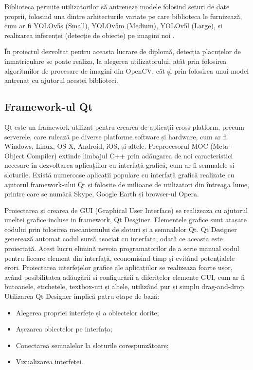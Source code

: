 \documentclass[12pt]{article}
\begin{document}
Biblioteca permite utilizatorilor s\u{a} antreneze modele folosind seturi de date proprii, folosind una dintre arhitecturile variate pe care biblioteca le furnizeaz\u{a}, cum ar fi YOLOv5s (Small), YOLOv5m (Medium), YOLOv5l (Large),  și realizarea inferenței (detecție de obiecte) pe imagini noi \cite{yolo}. 

\^{I}n proiectul dezvoltat pentru aceasta lucrare de diplom\u{a}, detecția placuțelor de \^{i}nmatriculare se poate realiza, la alegerea utilizatorului, at\^{a}t prin folosirea algoritmilor de procesare de imagini din OpenCV, c\^{a}t și prin folosirea unui model antrenat cu ajutorul acestei biblioteci.

\subsection{Framework-ul Qt}
Qt este un framework utilizat pentru crearea de aplicații cross-platform, precum serverele, care ruleaz\u{a} pe diverse platforme software și hardware, cum ar fi Windows, Linux, OS X, Android, iOS, și altele. Preprocesorul MOC (Meta-Object Compiler) extinde limbajul C++ prin ad\u{a}ugarea de noi caracteristici necesare \^{i}n dezvoltarea aplicațiilor cu interfaț\u{a} grafic\u{a}, cum ar fi semnalele si sloturile. Exist\u{a} numeroase aplicații populare cu interfaț\u{a} grafic\u{a} realizate cu ajutorul framework-ului Qt și folosite de milioane de utilizatori din \^{i}ntreaga lume, printre care se num\u{a}r\u{a} Skype, Google Earth și browser-ul Opera. \cite{qt}

Proiectarea și crearea de GUI (Graphical User Interface) se realizeaza cu ajutorul uneltei grafice incluse in framework, Qt Desginer. Elementele grafice sunt atașate codului prin folosirea mecanismului de sloturi și a semnalelor Qt. Qt Designer genereaz\u{a} automat codul surs\u{a} asociat cu interfața, odat\u{a} ce aceasta este proiectat\u{a}. \cite{qtdesigner} Acest lucru elimin\u{a} nevoia programatorilor de a scrie manual codul pentru fiecare element din interfaț\u{a}, economisind timp și evit\^{a}nd potențialele erori. Proiectarea interfețelor grafice ale aplicațiilor se realizeaza foarte ușor, av\^{a}nd posibilitatea ad\u{a}ug\u{a}rii si configur\u{a}rii a diferitelor elemente GUI, cum ar fi butoanele, etichetele, textbox-uri și altele, utiliz\^{a}nd pur și simplu drag-and-drop. Utilizarea Qt Designer implic\u{a} patru etape de baz\u{a}:
\begin{itemize}
    \item Alegerea propriei interfețe și a obiectelor dorite;
    \item Așezarea obiectelor pe interfața;
    \item Conectarea semnalelor la sloturile corespunz\u{a}toare;
    \item Vizualizarea interfeței.
\end{itemize}
\end{document}
